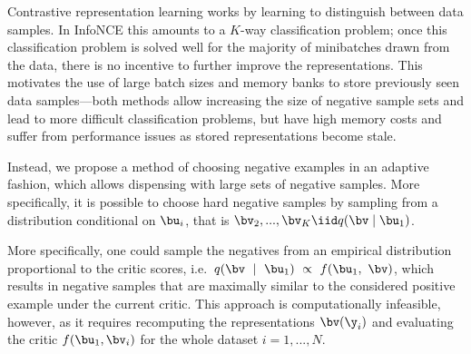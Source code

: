
Contrastive representation learning works by learning to distinguish between data samples.
In InfoNCE this amounts to a $K$-way classification problem;
once this classification problem is solved well for the majority of minibatches drawn from the data, there is no incentive to further improve the representations.
This motivates the use of large batch sizes \cite{henaff2019data} and memory banks \cite{he2019momentum,tian2019contrastive,wu2018unsupervised} to store previously seen data samples---both methods allow increasing the size of negative sample sets and lead to more difficult classification problems, but have high memory costs and suffer from performance issues as stored representations become stale.

Instead, we propose a method of choosing negative examples in an adaptive fashion, which allows dispensing with large sets of negative samples.
More specifically, it is possible to choose hard negative samples by sampling from a distribution conditional on $\bu_i$, that is $\bv_2, ..., \bv_K \iid q(\bv \mid \bu_1)$.

More specifically, one could sample the negatives from an empirical distribution proportional to the critic scores, i.e.\  $q(\bv~\mid~\bu_1)~\propto~f(\bu_1,~\bv)$, which results in negative samples that are maximally similar to the considered positive example under the current critic.
This approach is computationally infeasible, however, as it requires recomputing the representations $\bv(\y_i)$ and evaluating the critic $f(\bu_1, \bv_i)$ for the whole dataset $i=1,...,N$.

